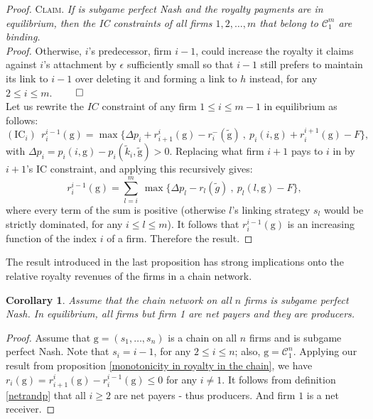 \documentclass{article}
\newtheorem{corollary}{Corollary}
\begin{document}
\begin{proof}
\indent \textsc{Claim.} \textit{If  is subgame perfect Nash and the royalty payments are in equilibrium, then the IC constraints of all firms $1,2,\ldots, m$ that belong to $\mathcal{C}_1^m$ are binding.}\\
\indent \textit{Proof.} Otherwise, $i$'s predecessor, firm $i-1$, could increase the royalty it claims against $i$'s attachment by $\epsilon$ sufficiently small so that $i-1$ still prefers to maintain its link to $i-1$ over deleting it and forming a link to $h$ instead, for any $2\leq i\leq m$. $\qed$ \\

Let us rewrite the $IC$ constraint of any firm $1\leq i\leq m-1$ in equilibrium as follows:
\begin{equation*}
(\text{IC}_i)~~ r^{i-1}_i(\text{g})= \max\{\Delta p_i+r^{i}_{i+1}(\text{g}) - r^-_i(\tilde{\text{g}})~,~ p_i(i,\text{g})+r^{i+1}_i(\text{g})-F\},
\end{equation*}
with $\Delta p_i=p_i(i,\text{g})-p_i(\tilde{k}_i,\tilde{\text{g}})>0$. Replacing what firm $i+1$ pays to $i$ in  by $i+1$'s IC constraint, and applying this recursively gives: 
\begin{equation*}
r^{i-1}_i(\text{g})= \sum_{l=i}^{m} ~\max\{\Delta p_l - r_l(\tilde{g}) ~,~ p_l(l,\text{g})-F\},
\end{equation*}
where every term of the sum is positive (otherwise $l$'s linking strategy $s_l$ would be strictly dominated, for any $i\leq l\leq m$). It follows that $r^{i-1}_i(\text{g})$ is an increasing function of the index $i$ of a firm. Therefore the result. 
\end{proof}

The result introduced in the last proposition has strong implications onto the relative royalty revenues of the firms in a chain network. \\

\begin{corollary}
Assume that the chain network on all $n$ firms is subgame perfect Nash. In equilibrium, all firms but firm 1 are net payers and they are producers.  
\end{corollary}
\begin{proof}
Assume that $\text{g}=(s_1,\ldots , s_n)$ is a chain on all $n$ firms and  is subgame perfect Nash. Note that $s_i=i-1$, for any $2\leq i\leq n$; also, $\text{g}=\mathcal{C}_1^n$. Applying our result from proposition \ref{monotonicity in royalty in the chain}, we have $r_i(\text{g})=r^{i}_{i+1}(\text{g})-r^{i-1}_i(\text{g})\leq 0$ for any $i\neq 1$. It follows from definition \ref{netrandp} that all $i\geq 2$ are net payers - thus producers. And firm $1$ is a net receiver. 
\end{proof}
\end{document}
